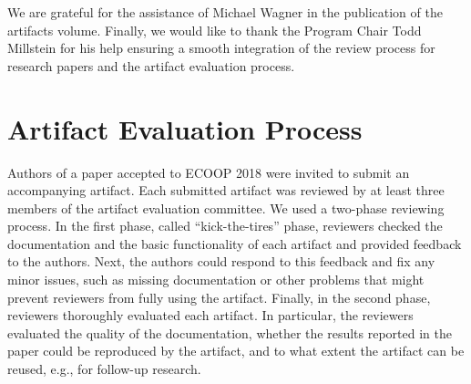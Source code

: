 \documentclass[a4paper,UKenglish]{dartsmaster}
\begin{document}
We are grateful for the assistance of Michael Wagner in the publication of
the artifacts volume. Finally, we would like to thank the Program Chair
Todd Millstein for his help ensuring a smooth integration of the review
process for research papers and the artifact evaluation process. 

\chapter{Artifact Evaluation Process}
Authors of a paper accepted to ECOOP 2018 were invited to submit an 
accompanying artifact. Each submitted artifact was reviewed by at least 
three members of the artifact evaluation committee. We used a two-phase 
reviewing process. In the first phase, called ``kick-the-tires'' phase, 
reviewers checked the documentation and the basic functionality of each 
artifact and provided feedback to the authors. Next, the authors could 
respond to this feedback and fix any minor issues, such as missing 
documentation or other problems that might prevent reviewers from fully 
using the artifact. Finally, in the second phase, reviewers thoroughly 
evaluated each artifact. In particular, the reviewers evaluated the quality 
of the documentation, whether the results reported in the paper could be 
reproduced by the artifact, and to what extent the artifact can be reused, 
e.g., for follow-up research.
\end{document}
